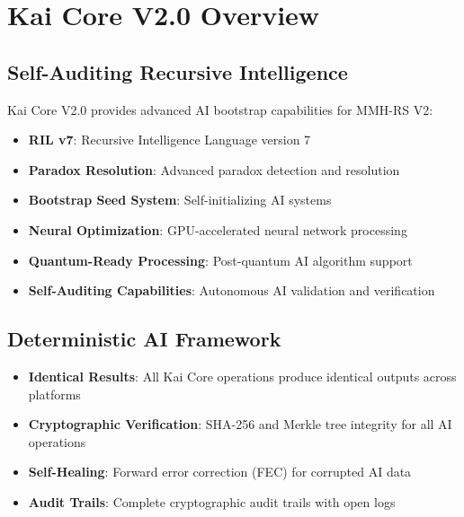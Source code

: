 \documentclass[12pt,a4paper]{article}
\begin{document}
\section{Kai Core V2.0 Overview}

\subsection{Self-Auditing Recursive Intelligence}
Kai Core V2.0 provides advanced AI bootstrap capabilities for MMH-RS V2:

\begin{itemize}
    \item \textbf{RIL v7}: Recursive Intelligence Language version 7
    \item \textbf{Paradox Resolution}: Advanced paradox detection and resolution
    \item \textbf{Bootstrap Seed System}: Self-initializing AI systems
    \item \textbf{Neural Optimization}: GPU-accelerated neural network processing
    \item \textbf{Quantum-Ready Processing}: Post-quantum AI algorithm support
    \item \textbf{Self-Auditing Capabilities}: Autonomous AI validation and verification
\end{itemize}

\subsection{Deterministic AI Framework}
\begin{itemize}
    \item \textbf{Identical Results}: All Kai Core operations produce identical outputs across platforms
    \item \textbf{Cryptographic Verification}: SHA-256 and Merkle tree integrity for all AI operations
    \item \textbf{Self-Healing}: Forward error correction (FEC) for corrupted AI data
    \item \textbf{Audit Trails}: Complete cryptographic audit trails with open logs
\end{itemize}

\end{document}
